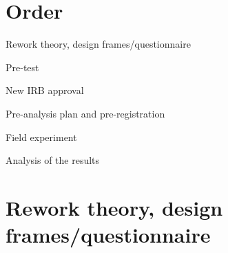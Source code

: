 \documentclass[12pt]{article}
\begin{document}
\section*{Order}
	\begin{coi}
		\item Rework theory, design frames/questionnaire
		\item Pre-test
		\item New IRB approval
		\item Pre-analysis plan and pre-registration
		\item Field experiment
		\item Analysis of the results
	\end{coi}


\section*{Rework theory, design frames/questionnaire}
\end{document}
